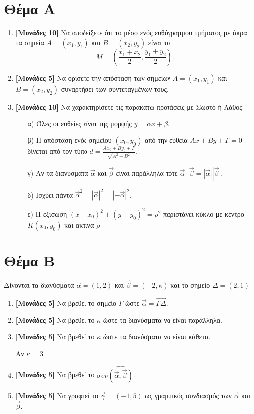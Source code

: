 \documentclass[12pt]{article}
\begin{document}
\section*{Θέμα Α}
  \noindent
  \begin{enumerate}
    \item \textbf{[Μονάδες 10]} Να αποδείξετε ότι το μέσο ενός ευθύγραμμου τμήματος με άκρα τα σημεία $Α=(x_1,y_1)$ και $Β=(x_2,y_2)$ είναι το
    $$Μ=(\frac{x_1+x_2}{2},\frac{y_1+y_2}{2}) \text{.}$$
    \item \textbf{[Μονάδες 5]} Να ορίσετε την απόσταση των σημείων $Α=(x_1,y_1)$ και $Β=(x_2,y_2)$ συναρτήσει των συντεταγμένων τους.
    \item \textbf{[Μονάδες 10]} Να χαρακτηρίσετε τις παρακάτω προτάσεις με Σωστό ή Λάθος
    \begin{enumerate}
      \item [α)] Όλες οι ευθείες είναι της μορφής $y=αx+β$.
      \item [β)] Η απόσταση ενός σημείου $(x_0,y_0)$ από την ευθεία $Αx+Βy+Γ=0$ δίνεται από τον τύπο $d=\frac{Αx_0+Βy_0+Γ}{\sqrt{Α^2+Β^2}}$.
      \item [γ)] Αν τα διανύσματα $\vec{α}$ και $\vec{β}$ είναι παράλληλα τότε $\vec{α}\cdot\vec{β}=|\vec{α}||\vec{β}|$.
      \item [δ)] Ισχύει πάντα $\vec{α}^2=|\vec{α}|^2=|-\vec{α}|^2$.
      \item [ε)] Η εξίσωση $(x-x_0)^2+(y-y_0)^2=ρ^2$ παριστάνει κύκλο με κέντρο $Κ(x_0,y_0)$ και ακτίνα $ρ$
    \end{enumerate}
  \end{enumerate}

\section*{Θέμα Β}
  \noindent
  Δίνονται τα διανύσματα $\vec{α}=(1,2)$ και $\vec{β}=(-2,κ)$ και το σημείο $Δ=(2,1)$
  \begin{enumerate}
    \item \textbf{[Μονάδες 5]} Να βρεθεί το σημείο $Γ$ ώστε $\vec{α}=\overrightarrow{ΓΔ}$.
    \item \textbf{[Μονάδες 5]} Να βρεθεί το $κ$ ώστε τα διανύσματα να είναι παράλληλα.
    \item \textbf{[Μονάδες 5]} Να βρεθεί το $κ$ ώστε τα διανύσματα να είναι κάθετα.

    Αν $κ=3$
    \item \textbf{[Μονάδες 5]} Να βρεθεί το $συν\widehat{(\vec{α},\vec{β})}$.
    \item \textbf{[Μονάδες 5]} Να γραφτεί το $\vec{γ}=(-1,5)$ ως γραμμικός συνδιασμός των $\vec{α}$ και $\vec{β}$.

  \end{enumerate}
\end{document}
